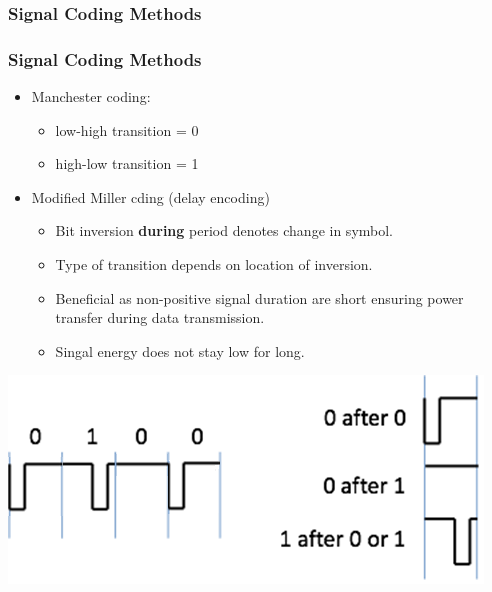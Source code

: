 \documentclass{beamer}
\begin{document}
\subsubsection{Signal Coding Methods}
\begin{frame}
\frametitle{Signal Coding Methods}
\begin{itemize}
\item Manchester coding:
\begin{itemize}
\item low-high transition = 0
\item high-low transition = 1
\end{itemize}
\item Modified Miller cding (delay encoding)
\begin{itemize}
\item Bit inversion \textbf{during} period denotes change in symbol.
\item Type of transition depends on location of inversion.
\item Beneficial as non-positive signal duration are short ensuring power transfer during data transmission.
\item Singal energy does not stay low for long.

\end{itemize}
\end{itemize}
\centerline{ \includegraphics[scale=0.25]{modmil.png}}
\end{frame}
\end{document}
